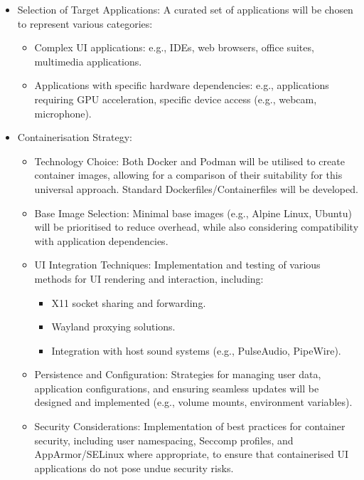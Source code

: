 \documentclass[journal,onecolumn]{IEEEtran}
\begin{document}
\begin{itemize}
    \item Selection of Target Applications: A curated set of applications will be chosen to represent various categories: 
    \begin{itemize}
        \item Complex UI applications: e.g., IDEs, web browsers, office suites, multimedia applications. 
        \item Applications with specific hardware dependencies: e.g., applications requiring GPU acceleration, specific device access (e.g., webcam, microphone). 
    \end{itemize}
    \item Containerisation Strategy: 
    \begin{itemize}
        \item Technology Choice: Both Docker and Podman will be utilised to create container images, allowing for a comparison of their suitability for this universal approach. Standard Dockerfiles/Containerfiles will be developed. 
        \item Base Image Selection: Minimal base images (e.g., Alpine Linux, Ubuntu) will be prioritised to reduce overhead, while also considering compatibility with application dependencies. 
        \item UI Integration Techniques: Implementation and testing of various methods for UI rendering and interaction, including:
        \begin{itemize}
            \item X11 socket sharing and forwarding. 
            \item Wayland proxying solutions. 
            \item Integration with host sound systems (e.g., PulseAudio, PipeWire). 
        \end{itemize}
        \item Persistence and Configuration: Strategies for managing user data, application configurations, and ensuring seamless updates will be designed and implemented (e.g., volume mounts, environment variables). 
        \item Security Considerations: Implementation of best practices for container security, including user namespacing, Seccomp profiles, and AppArmor/SELinux where appropriate, to ensure that containerised UI applications do not pose undue security risks. 

    \end{itemize}
\end{itemize}
\end{document}
